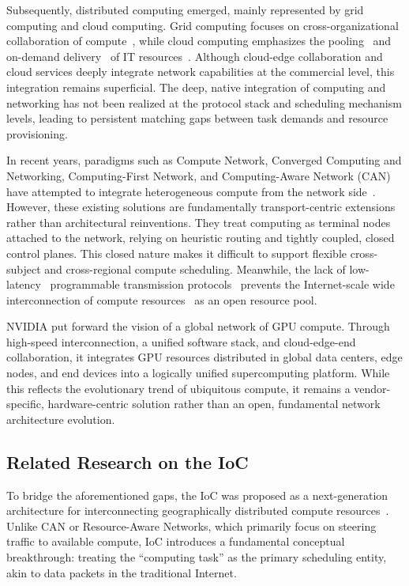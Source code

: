 \documentclass{ccjnl}
\begin{document}
Subsequently, distributed computing emerged, mainly represented by grid computing and cloud computing. Grid computing focuses on cross-organizational collaboration of compute~\cite{12,13}, while cloud computing emphasizes the pooling~\cite{14} and on-demand delivery~\cite{15} of IT resources~\cite{16}. Although cloud-edge collaboration and cloud services deeply integrate network capabilities at the commercial level, this integration remains superficial. The deep, native integration of computing and networking has not been realized at the protocol stack and scheduling mechanism levels, leading to persistent matching gaps between task demands and resource provisioning. 

In recent years, paradigms such as Compute Network, Converged Computing and Networking, Computing-First Network, and Computing-Aware Network (CAN) have attempted to integrate heterogeneous compute from the network side~\cite{28}. However, these existing solutions are fundamentally transport-centric extensions rather than architectural reinventions. They treat computing as terminal nodes attached to the network, relying on heuristic routing and tightly coupled, closed control planes. This closed nature makes it difficult to support flexible cross-subject and cross-regional compute scheduling. Meanwhile, the lack of low-latency~\cite{17} programmable transmission protocols~\cite{19} prevents the Internet-scale wide interconnection of compute resources~\cite{20} as an open resource pool.

NVIDIA put forward the vision of a global network of GPU compute. Through high-speed interconnection, a unified software stack, and cloud-edge-end collaboration, it integrates GPU resources distributed in global data centers, edge nodes, and end devices into a logically unified supercomputing platform. While this reflects the evolutionary trend of ubiquitous compute, it remains a vendor-specific, hardware-centric solution rather than an open, fundamental network architecture evolution.


\subsection{Related Research on the IoC}
\label{s2-2}
To bridge the aforementioned gaps, the IoC was proposed as a next-generation architecture for interconnecting geographically distributed compute resources~\cite{9}. Unlike CAN or Resource-Aware Networks, which primarily focus on steering traffic to available compute, IoC introduces a fundamental conceptual breakthrough: treating the “computing task” as the primary scheduling entity, akin to data packets in the traditional Internet.
\end{document}
